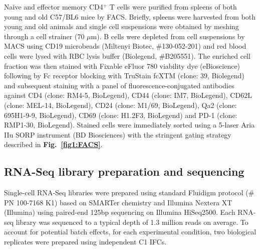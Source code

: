 Naive and effector memory CD4$^+$ T cells were purified from spleens of both young and old C57/BL6 mice by FACS.  Briefly, spleens were harvested from both young and old animals and single cell suspensions were obtained by meshing through a cell strainer (70 $\mu$m). B cells were depleted from cell suspensions by MACS using CD19 microbeads (Miltenyi Biotec, \#{}130-052-201) and red blood cells were lysed with RBC lysis buffer (Biolegend, \#{}B205551). The enriched cell fraction was then stained with Fixable eFluor 780 viability dye (eBioscience) following by Fc receptor blocking with TruStain fcXTM (clone: 39, Biolegend) and subsequent staining with a panel of fluorescence-conjugated antibodies against CD4 (clone: RM4-5, BioLegend), CD44 (clone: IM7, BioLegend), CD62L (clone: MEL-14, BioLegend), CD24 (clone: M1/69, BioLegend), Qa2 (clone: 695H1-9-9, BioLegend), CD69 (clone: H1.2F3, BioLegend) and PD-1 (clone: RMP1-30, BioLegend).  Stained cells were immediately sorted using a 5-laser Aria IIu SORP instrument (BD Biosciences) with the stringent gating strategy described in \textbf{Fig.~\ref{fig1:FACS}}. 

\subsection{RNA-Seq library preparation and sequencing}
\label{appA.1:RNA-Seq}

Single-cell RNA-Seq libraries were prepared using standard Fluidigm protocol (\# PN 100-7168 K1) based on SMARTer chemistry and Illumina Nextera XT (Illumina) using paired-end 125bp sequencing on Illumina HiSeq2500. Each RNA-seq library was sequenced to a typical depth of 1.3 million reads on average. To account for potential batch effects, for each experimental condition, two biological replicates were prepared using independent C1 IFCs.
